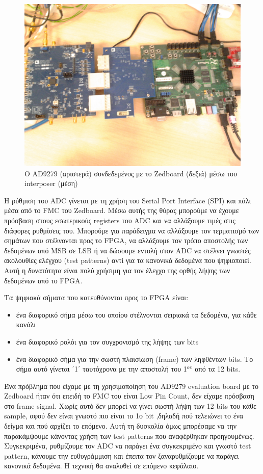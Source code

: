 \documentclass[12pt,a4paper]{book}
\begin{document}
\begin{figure}
	\centering
	\includegraphics[width=\textwidth]{ad9279}
	\caption{Ο AD9279 (αριστερά) συνδεδεμένος με το Zedboard (δεξιά) μέσω του interposer (μέση)}
	\label{ad9279}
\end{figure}

Η ρύθμιση του ADC γίνεται με τη χρήση του Serial Port Interface (SPI) και πάλι μέσα από το FMC του Zedboard. Μέσω αυτής της θύρας μπορούμε να έχουμε πρόσβαση στους εσωτερικούς registers  του ADC και να αλλάξουμε τιμές στις διάφορες ρυθμίσεις του. Μπορούμε για παράδειγμα να αλλάξουμε τον τερματισμό των σημάτων που στέλνονται προς το FPGA, να αλλάξουμε τον τρόπο αποστολής των δεδομένων από MSB σε LSB ή να δώσουμε εντολή στον ADC να στέλνει γνωστές ακολουθίες ελέγχου (test patterns) αντί για τα κανονικά δεδομένα που ψηφιοποιεί. Αυτή η δυνατότητα είναι πολύ χρήσιμη για τον έλεγχο της ορθής λήψης των δεδομένων από το FPGA.

Τα ψηφιακά σήματα που κατευθύνονται προς το FPGA είναι:
\begin{itemize}
\item ένα διαφορικό σήμα μέσω του οποίου στέλνονται σειριακά τα δεδομένα, για κάθε κανάλι
\item ένα διαφορικό ρολόι για τον συγχρονισμό της λήψης των bits
\item ένα διαφορικό σήμα για την σωστή πλαισίωση (frame) των ληφθέντων bits. Το σήμα αυτό γίνεται ΄1΄ ταυτόχρονα με την αποστολή του 1$ ^{o\upsilon} $ από τα 12 bits.
\end{itemize}

Ένα πρόβλημα που είχαμε με τη χρησιμοποίηση του AD9279 evaluation board με το Zedboard ήταν ότι επειδή το FMC του είναι Low Pin Count, δεν είχαμε πρόσβαση στο frame signal. Χωρίς αυτό δεν μπορεί να γίνει σωστή λήψη των 12 bits  του κάθε sample, αφού δεν είναι γνωστό πιο είναι το 1ο bit ,δηλαδή πού τελειώνει το ένα δείγμα και πού αρχίζει το επόμενο. Αυτή τη δυσκολία όμως μπορέσαμε να την παρακάμψουμε κάνοντας χρήση των test patterns που αναφέρθηκαν προηγουμένως. Συγκεκριμένα, ρυθμίζουμε τον ADC να παράγει ένα συγκεκριμένο και γνωστό test pattern, κάνουμε την ευθυγράμμιση και έπειτα τον ξαναρυθμίζουμε να παράγει κανονικά δεδομένα. Η τεχνική θα αναλυθεί σε επόμενο κεφάλαιο. 
\end{document}
